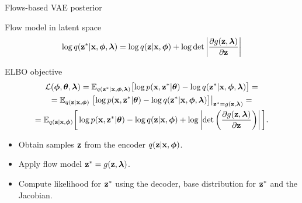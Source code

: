 \begin{frame}{Flows-based VAE posterior}
	
	\begin{block}{Flow model in latent space}
		\vspace{-0.3cm}
		\[
			\log q(\mathbf{z}^* | \mathbf{x}, \boldsymbol{\phi}, \boldsymbol{\lambda}) = \log q(\mathbf{z} | \mathbf{x}, \boldsymbol{\phi}) + \log \det \left | \frac{\partial g(\mathbf{z}, \boldsymbol{\lambda})}{\partial \mathbf{z}}\right|
		\]
		\vspace{-0.3cm}
	\end{block}
	\begin{block}{ELBO objective}
		\vspace{-0.5cm}
		\begin{multline*}
			\mathcal{L} (\boldsymbol{\phi}, \boldsymbol{\theta}, \boldsymbol{\lambda})  
			= \mathbb{E}_{q(\mathbf{z}^* | \mathbf{x}, \boldsymbol{\phi}, \boldsymbol{\lambda})} \bigl[\log p(\mathbf{x}, \mathbf{z}^* | \boldsymbol{\theta}) - \log q(\mathbf{z}^*| \mathbf{x}, \boldsymbol{\phi}, \boldsymbol{\lambda}) \bigr] = \\
			= \mathbb{E}_{q(\mathbf{z} | \mathbf{x}, \boldsymbol{\phi})} \left. \bigl[\log p(\mathbf{x}, \mathbf{z}^* | \boldsymbol{\theta}) - \log q(\mathbf{z}^*| \mathbf{x}, \boldsymbol{\phi}, \boldsymbol{\lambda}) \bigr]\right|_{\mathbf{z}^* = g(\mathbf{z}, \boldsymbol{\lambda})} = \\
			= \mathbb{E}_{q(\mathbf{z} | \mathbf{x}, \boldsymbol{\phi})} \bigg[\log p(\mathbf{x}, \mathbf{z}^* | \boldsymbol{\theta}) -  \log q(\mathbf{z} | \mathbf{x}, \boldsymbol{\phi} ) + \log \left| \det \left( \frac{\partial g(\mathbf{z}, \boldsymbol{\lambda})}{\partial \mathbf{z}} \right) \right| \bigg].
		\end{multline*}
	\end{block}
	\begin{itemize}
		\item Obtain samples $\mathbf{z}$ from the encoder $q(\mathbf{z} | \mathbf{x}, \boldsymbol{\phi})$.
		\item Apply flow model $\mathbf{z}^* = g(\mathbf{z}, \boldsymbol{\lambda})$.
		\item Compute likelihood for $\mathbf{z}^*$ using the decoder, base distribution for $\mathbf{z}^*$ and the Jacobian.
	\end{itemize}
\end{frame}
